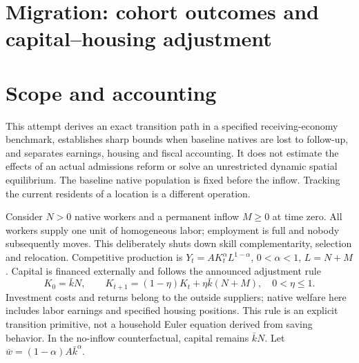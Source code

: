 \documentclass[11pt,a4paper]{article}
\begin{document}
\section*{Migration: cohort outcomes and capital--housing adjustment}
\section{Scope and accounting}
This attempt derives an exact transition path in a specified receiving-economy benchmark, establishes sharp bounds when baseline natives are lost to follow-up, and separates earnings, housing and fiscal accounting. It does not estimate the effects of an actual admissions reform or solve an unrestricted dynamic spatial equilibrium. The baseline native population is fixed before the inflow. Tracking the current residents of a location is a different operation.

Consider $N>0$ native workers and a permanent inflow $M\ge0$ at time zero. All workers supply one unit of homogeneous labor; employment is full and nobody subsequently moves. This deliberately shuts down skill complementarity, selection and relocation. Competitive production is
$Y_t=A K_t^\alpha L^{1-\alpha}$, $0<\alpha<1$, $L=N+M$. Capital is financed externally and follows the announced adjustment rule
\[
 K_0=\bar kN,\qquad K_{t+1}=(1-\eta)K_t+\eta\bar k(N+M),\quad0<\eta\le1.
\]
Investment costs and returns belong to the outside suppliers; native welfare here includes labor earnings and specified housing positions. This rule is an explicit transition primitive, not a household Euler equation derived from saving behavior. In the no-inflow counterfactual, capital remains $\bar kN$. Let
$\bar w=(1-\alpha)A\bar k^\alpha$.
\end{document}
